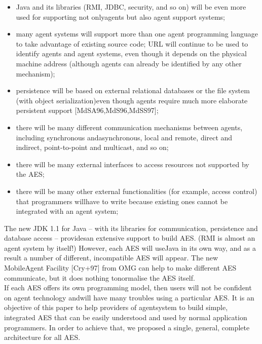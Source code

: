 \documentclass{article}
\begin{document}
\begin{itemize}
    \item Java and its libraries (RMI, JDBC, security, and so on) will be even more used for supporting not onlyagents but also agent support systems;
    \item many agent systems will support more than one agent programming language to take advantage of existing source code;
    \itemthe URL will continue to be used to identify agents and agent systems, even though it depends on the physical machine address (although agents can already be identified by any other mechanism);
    \item  persistence will be based on external relational databases or the file system (with object serialization)even though agents require much more elaborate persistent support [MdSA96,MdS96,MdSS97];
    \item there will be many different communication mechanisms between agents, including synchronous andasynchronous, local and remote, direct and indirect, point-to-point and multicast, and so on;
    \item there will be many external interfaces to access resources not supported by the AES;
    \item there will be many other external functionalities (for example, access control) that programmers willhave to write because existing ones cannot be integrated with an agent system;
\end{itemize}
The new JDK 1.1 for Java – with its libraries for communication, persistence and database access – providesan extensive support to build AES. (RMI is almost an agent system by itself!) However, each AES will useJava in its own way, and as a result a number of different, incompatible AES will appear. The new MobileAgent Facility [Cry+97] from OMG can help to make different AES communicate, but it does nothing tonormalise the AES itself.\\If each AES offers its own programming model, then users will not be confident on agent technology andwill have many troubles using a particular AES. It is an objective of this paper to help providers of agentsystem to build simple, integrated AES that can be easily understood and used by normal application programmers. In order to achieve that, we proposed a single, general, complete architecture for all AES.
\end{document}
